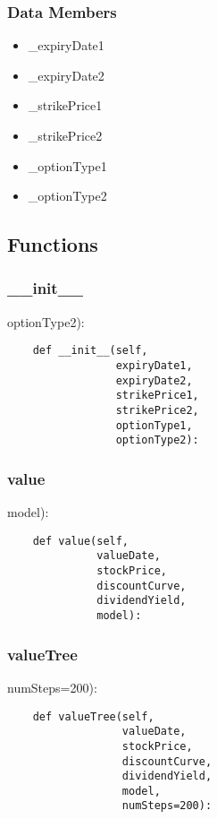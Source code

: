 \documentclass[twoside,11pt]{book}
\begin{document}
\subsubsection*{Data Members}
\begin{itemize}
\item{\_expiryDate1}
\item{\_expiryDate2}
\item{\_strikePrice1}
\item{\_strikePrice2}
\item{\_optionType1}
\item{\_optionType2}
\end{itemize}

\subsection*{Functions}

\subsubsection*{{\bf \_\_init\_\_}}
optionType2): 

\begin{lstlisting}
    def __init__(self,
                 expiryDate1,
                 expiryDate2,
                 strikePrice1,
                 strikePrice2,
                 optionType1,
                 optionType2):
\end{lstlisting}

\subsubsection*{{\bf value}}
model): 

\begin{lstlisting}
    def value(self,
              valueDate,
              stockPrice,
              discountCurve,
              dividendYield,
              model):
\end{lstlisting}

\subsubsection*{{\bf valueTree}}
numSteps=200): 

\begin{lstlisting}
    def valueTree(self,
                  valueDate,
                  stockPrice,
                  discountCurve,
                  dividendYield,
                  model,
                  numSteps=200):
\end{lstlisting}
\end{document}
